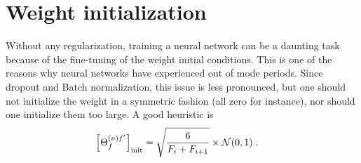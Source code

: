 \section{Weight initialization}

Without any regularization, training a neural network can be a daunting task because of the fine-tuning of the weight initial conditions. This is one of the reasons why neural networks have experienced out of mode periods. Since dropout and Batch normalization, this issue is less pronounced, but one should not initialize the weight in a symmetric fashion (all zero for instance), nor should one initialize them too large. A good heuristic is 
\begin{align}
\left[\Theta^{(\nu)f'}_f\right]_{{\rm init}}&=\sqrt{\frac{6}{F_i+F_{i+1}}}\times\mathcal{N}(0,1)\;.
\end{align}

